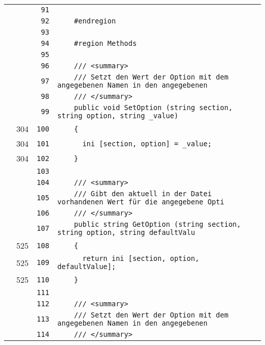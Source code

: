 \documentclass[a4paper,10pt]{article}
\begin{document}
\begin{longtable}[l]{lrrl}
\cellcolor{gray} &  & \verb~91~ & \verb~~\\
\cellcolor{gray} &  & \verb~92~ & \verb~    #endregion~\\
\cellcolor{gray} &  & \verb~93~ & \verb~~\\
\cellcolor{gray} &  & \verb~94~ & \verb~    #region Methods~\\
\cellcolor{gray} &  & \verb~95~ & \verb~~\\
\cellcolor{gray} &  & \verb~96~ & \verb~    /// <summary>~\\
\cellcolor{gray} &  & \verb~97~ & \verb~    /// Setzt den Wert der Option mit dem angegebenen Namen in den angegebenen~\\
\cellcolor{gray} &  & \verb~98~ & \verb~    /// </summary>~\\
\cellcolor{gray} &  & \verb~99~ & \verb~    public void SetOption (string section, string option, string _value)~\\
\cellcolor{green} & 304 & \verb~100~ & \verb~    {~\\
\cellcolor{green} & 304 & \verb~101~ & \verb~      ini [section, option] = _value;~\\
\cellcolor{green} & 304 & \verb~102~ & \verb~    }~\\
\cellcolor{gray} &  & \verb~103~ & \verb~~\\
\cellcolor{gray} &  & \verb~104~ & \verb~    /// <summary>~\\
\cellcolor{gray} &  & \verb~105~ & \verb~    /// Gibt den aktuell in der Datei vorhandenen Wert für die angegebene Opti~\\
\cellcolor{gray} &  & \verb~106~ & \verb~    /// </summary>~\\
\cellcolor{gray} &  & \verb~107~ & \verb~    public string GetOption (string section, string option, string defaultValu~\\
\cellcolor{green} & 525 & \verb~108~ & \verb~    {~\\
\cellcolor{green} & 525 & \verb~109~ & \verb~      return ini [section, option, defaultValue];~\\
\cellcolor{green} & 525 & \verb~110~ & \verb~    }~\\
\cellcolor{gray} &  & \verb~111~ & \verb~~\\
\cellcolor{gray} &  & \verb~112~ & \verb~    /// <summary>~\\
\cellcolor{gray} &  & \verb~113~ & \verb~    /// Setzt den Wert der Option mit dem angegebenen Namen in den angegebenen~\\
\cellcolor{gray} &  & \verb~114~ & \verb~    /// </summary>~\\

\end{longtable}
\end{document}
